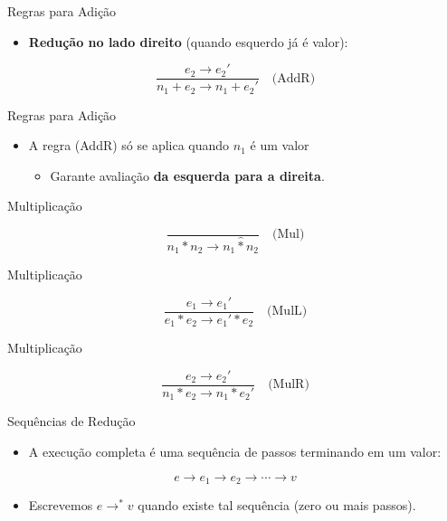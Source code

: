 \begin{frame}{Regras para Adição}

    \begin{itemize}

        \item
        \textbf{Redução no lado direito} (quando esquerdo já é valor):
    \end{itemize}

    \[\frac{e_2 \to e_2'}{n_1 + e_2 \to n_1 + e_2'} \quad \text{(AddR)}\]
\end{frame}

\begin{frame}{Regras para Adição}

    \begin{itemize}

        \item
        A regra (AddR) só se aplica quando \(n_1\) é um valor

        \begin{itemize}

            \item
            Garante avaliação \textbf{da esquerda para a direita}.
        \end{itemize}
    \end{itemize}
\end{frame}

\begin{frame}{Multiplicação}

    \[\frac{}{n_1 * n_2 \to n_1 \mathbin{\hat{*}} n_2} \quad \text{(Mul)}\]
\end{frame}

\begin{frame}{Multiplicação}

    \[\frac{e_1 \to e_1'}{e_1 * e_2 \to e_1' * e_2} \quad \text{(MulL)}\]
\end{frame}

\begin{frame}{Multiplicação}

    \[\frac{e_2 \to e_2'}{n_1 * e_2 \to n_1 * e_2'} \quad \text{(MulR)}\]
\end{frame}

\begin{frame}{Sequências de Redução}

    \begin{itemize}

        \item
        A execução completa é uma sequência de passos terminando em um valor:
    \end{itemize}

    \[e \to e_1 \to e_2 \to \cdots \to v\]

    \begin{itemize}

        \item
        Escrevemos \(e \to^* v\) quando existe tal sequência (zero ou mais
        passos).
    \end{itemize}
\end{frame}


